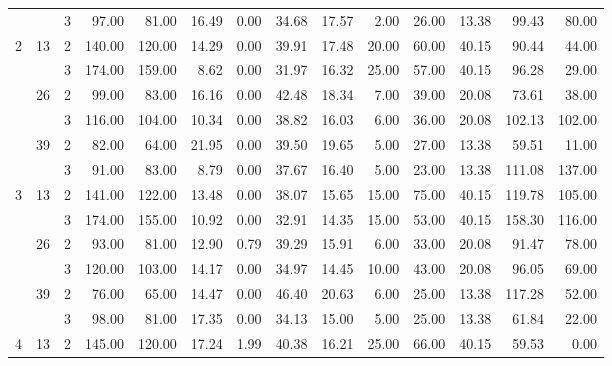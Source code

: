 \begin{tabular}{lllrrrrrrrrrrr}
  &    & 3 &    97.00 &     81.00 & 16.49 &    0.00 &   34.68 &   17.57 &    2.00 &   26.00 &   13.38 &  99.43 &    80.00 \\
\cline{1-14}
\cline{2-14}
\multirow{6}{*}{2} & \multirow{2}{*}{13} & 2 &   140.00 &    120.00 & 14.29 &    0.00 &   39.91 &   17.48 &   20.00 &   60.00 &   40.15 &  90.44 &    44.00 \\
  &    & 3 &   174.00 &    159.00 &  8.62 &    0.00 &   31.97 &   16.32 &   25.00 &   57.00 &   40.15 &  96.28 &    29.00 \\
\cline{2-14}
  & \multirow{2}{*}{26} & 2 &    99.00 &     83.00 & 16.16 &    0.00 &   42.48 &   18.34 &    7.00 &   39.00 &   20.08 &  73.61 &    38.00 \\
  &    & 3 &   116.00 &    104.00 & 10.34 &    0.00 &   38.82 &   16.03 &    6.00 &   36.00 &   20.08 & 102.13 &   102.00 \\
\cline{2-14}
  & \multirow{2}{*}{39} & 2 &    82.00 &     64.00 & 21.95 &    0.00 &   39.50 &   19.65 &    5.00 &   27.00 &   13.38 &  59.51 &    11.00 \\
  &    & 3 &    91.00 &     83.00 &  8.79 &    0.00 &   37.67 &   16.40 &    5.00 &   23.00 &   13.38 & 111.08 &   137.00 \\
\cline{1-14}
\cline{2-14}
\multirow{6}{*}{3} & \multirow{2}{*}{13} & 2 &   141.00 &    122.00 & 13.48 &    0.00 &   38.07 &   15.65 &   15.00 &   75.00 &   40.15 & 119.78 &   105.00 \\
  &    & 3 &   174.00 &    155.00 & 10.92 &    0.00 &   32.91 &   14.35 &   15.00 &   53.00 &   40.15 & 158.30 &   116.00 \\
\cline{2-14}
  & \multirow{2}{*}{26} & 2 &    93.00 &     81.00 & 12.90 &    0.79 &   39.29 &   15.91 &    6.00 &   33.00 &   20.08 &  91.47 &    78.00 \\
  &    & 3 &   120.00 &    103.00 & 14.17 &    0.00 &   34.97 &   14.45 &   10.00 &   43.00 &   20.08 &  96.05 &    69.00 \\
\cline{2-14}
  & \multirow{2}{*}{39} & 2 &    76.00 &     65.00 & 14.47 &    0.00 &   46.40 &   20.63 &    6.00 &   25.00 &   13.38 & 117.28 &    52.00 \\
  &    & 3 &    98.00 &     81.00 & 17.35 &    0.00 &   34.13 &   15.00 &    5.00 &   25.00 &   13.38 &  61.84 &    22.00 \\
\cline{1-14}
\cline{2-14}
\multirow{6}{*}{4} & \multirow{2}{*}{13} & 2 &   145.00 &    120.00 & 17.24 &    1.99 &   40.38 &   16.21 &   25.00 &   66.00 &   40.15 &  59.53 &     0.00 \\

\end{tabular}

